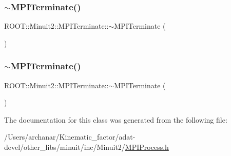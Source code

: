 \mbox{\label{classROOT_1_1Minuit2_1_1MPITerminate_a3a0e732a5e0112404bfdd195d7826c98}} 
\subsubsection{\texorpdfstring{$\sim$MPITerminate()}{~MPITerminate()}\hspace{0.1cm}{\footnotesize\ttfamily [2/3]}}
{\footnotesize\ttfamily R\+O\+O\+T\+::\+Minuit2\+::\+M\+P\+I\+Terminate\+::$\sim$\+M\+P\+I\+Terminate (\begin{DoxyParamCaption}{ }\end{DoxyParamCaption})\hspace{0.3cm}{\ttfamily [inline]}}

\mbox{\label{classROOT_1_1Minuit2_1_1MPITerminate_a3a0e732a5e0112404bfdd195d7826c98}} 
\subsubsection{\texorpdfstring{$\sim$MPITerminate()}{~MPITerminate()}\hspace{0.1cm}{\footnotesize\ttfamily [3/3]}}
{\footnotesize\ttfamily R\+O\+O\+T\+::\+Minuit2\+::\+M\+P\+I\+Terminate\+::$\sim$\+M\+P\+I\+Terminate (\begin{DoxyParamCaption}{ }\end{DoxyParamCaption})\hspace{0.3cm}{\ttfamily [inline]}}



The documentation for this class was generated from the following file\+:\begin{DoxyCompactItemize}
\item 
/\+Users/archanar/\+Kinematic\+\_\+factor/adat-\/devel/other\+\_\+libs/minuit/inc/\+Minuit2/\mbox{\hyperlink{adat-devel_2other__libs_2minuit_2inc_2Minuit2_2MPIProcess_8h}{M\+P\+I\+Process.\+h}}\end{DoxyCompactItemize}

